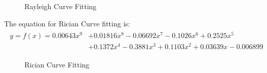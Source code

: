 \begin{figure}[htpb!]
	\centerline{}
	\caption{Rayleigh Curve Fitting}
	\label{fig:rayleigh_fit}
\end{figure}

\pagebreak

The equation for Rician Curve fitting is:
\begin{align*}
\begin{split}
	y=f(x) = 0.00643x^9 &+ 0.01816x^8 - 0.06692x^7 - 0.1026x^6 + 0.2525x^5\\& + 0.1372x^4 - 0.3881x^3 + 0.1103x^2 + 0.03639x - 0.006899
\end{split}
\end{align*}

\begin{figure}[htpb!]
	\centerline{}
	\caption{Rician Curve Fitting}
	\label{fig:rician_fit}
\end{figure}

\pagebreak



